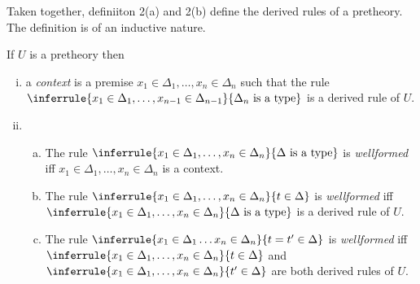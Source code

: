 Taken together, definiiton 2(a) and 2(b) define the derived rules of a pretheory.
%
The definition is of an inductive nature.

\begin{definition}[2(a)]
If $U$ is a pretheory  then 
\begin{enumerate}[(i)]
\item  a \emph{context} is a premise $x_1\in\Delta_1,\ldots,x_n\in\Delta_n$ such that the rule $\inferrule{x_1\in\Delta_1,\ldots,x_{n-1}\in\Delta_{n-1}}{\Delta_n\isatype}$ is a derived rule of $U$.
%
\item
\begin{enumerate}[(a)]
\item The rule $\inferrule{x_1\in\Delta_1,\ldots,x_n\in\Delta_n}{\Delta\isatype}$ is \emph{wellformed} iff $x_1\in\Delta_1,\ldots,x_n\in\Delta_n$ is a context.
\item The rule $\inferrule{x_1\in\Delta_1,\ldots,x_n\in\Delta_n}{t\in\Delta}$ is \emph{wellformed} iff $\inferrule{x_1\in\Delta_1,\ldots,x_n\in\Delta_n}{\Delta\isatype}$ is a derived rule of $U$.
\item {} The rule $\inferrule{x_1\in\Delta_1\ldots x_n\in\Delta_n}{t=t'\in\Delta}$ is \emph{wellformed} iff $\inferrule{x_1\in\Delta_1,\ldots,x_n\in\Delta_n}{t\in\Delta}$ and $\inferrule{x_1\in\Delta_1,\ldots,x_n\in\Delta_n}{t'\in\Delta}$ are both derived rules of $U$.
\end{enumerate}
\end{enumerate}
\end{definition}


